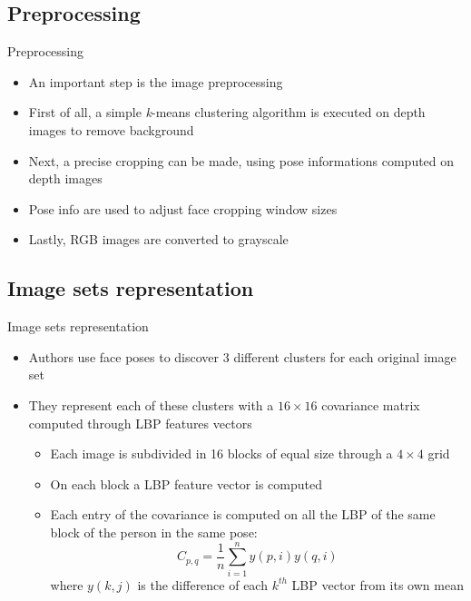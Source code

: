 \documentclass[unknownkeysallowed]{beamer}
\begin{document}
\subsection{Preprocessing}
\begin{frame}{Preprocessing}
	\begin{itemize}
		\item An important step is the image preprocessing
		\item First of all, a simple \textit{k}-means clustering algorithm is executed on depth images to remove background
		\item Next, a precise cropping can be made, using pose informations computed on depth images
		\item Pose info are used to adjust face cropping window sizes
		\item Lastly, RGB images are converted to grayscale
	\end{itemize}
\end{frame}

\subsection{Image sets representation}
\begin{frame}{Image sets representation}
	\begin{itemize}
		\item Authors use face poses to discover 3 different clusters for each original image set
		\item They represent each of these clusters with a $16 \times 16$ covariance matrix computed through LBP features vectors
			\begin{itemize}
				\item Each image is subdivided in 16 blocks of equal size through a $4 \times 4$ grid
				\item On each block a LBP feature vector is computed
				\item Each entry of the covariance is computed on all the LBP of the same block of the person in the same pose:
					$$
					C_{p, q} = \frac{1}{n} \sum_{i=1}^n
					y(p, i)y(q, i)
					$$
				where $y(k, j)$ is the difference of each $k^{th}$ LBP vector from its own mean
			\end{itemize}
	\end{itemize}
\end{frame}
\end{document}
